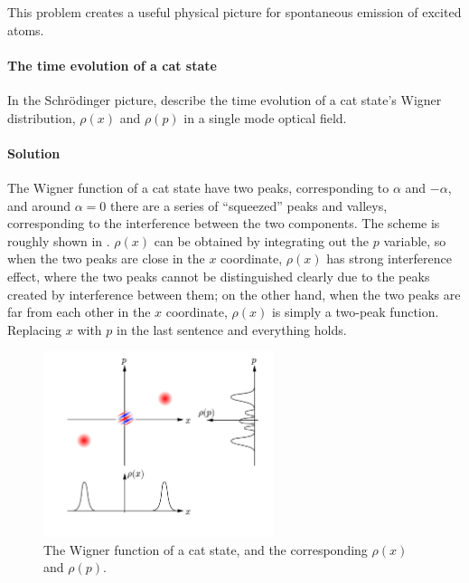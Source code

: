 \documentclass[hyperref, a4paper]{article}
\begin{document}
This problem creates a useful physical picture for spontaneous emission of excited atoms.

\paragraph{}

\paragraph{The time evolution of a cat state} In the Schrödinger picture, describe the time evolution of a cat state's Wigner distribution, $\rho(x)$ and $\rho(p)$ in a single mode optical field.

\paragraph{Solution} The Wigner function of a cat state have two peaks, corresponding to $\alpha$ and $-\alpha$, and around $\alpha = 0$ there are a series of ``squeezed'' peaks and valleys, corresponding to the interference between the two components.
The scheme is roughly shown in .
$\rho(x)$ can be obtained by integrating out the $p$ variable, so when the two peaks are close in the $x$ coordinate, $\rho(x)$ has strong interference effect, where the two peaks cannot be distinguished clearly due to the peaks created by interference between them; on the other hand, when the two peaks are far from each other in the $x$ coordinate, $\rho(x)$ is simply a two-peak function.
Replacing $x$ with $p$ in the last sentence and everything holds.

\begin{figure}
    \centering
    \includegraphics[width=0.6\textwidth]{cat-state.png}
    \caption{The Wigner function of a cat state, and the corresponding $\rho(x)$ and $\rho(p)$.}
    \label{fig:cat-state}
\end{figure}
\end{document}
